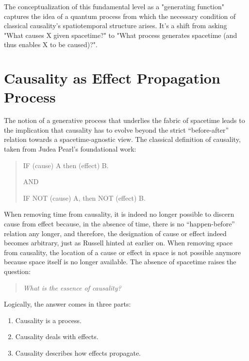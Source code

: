 \documentclass{article}
\begin{document}
The conceptualization of this fundamental level as a "generating function" captures the idea of a quantum process from which the necessary condition of classical causality's spatiotemporal structure arises. It's a shift from asking "What causes X given spacetime?" to "What process generates spacetime (and thus enables X to be caused)?".


\section{Causality as Effect Propagation Process}
\label{sec:epp}

The notion of a generative process that underlies the fabric of spacetime leads to the implication that causality has to evolve beyond the strict “before-after” relation towards a spacetime-agnostic view. The classical definition of causality, taken from Judea Pearl's foundational work\cite{pearl2000causality}: 

\begin{quote}
    IF (cause) A then (effect) B.
    
    AND 
    
    IF NOT (cause) A, then NOT (effect) B.
\end{quote}

When removing time from causality, it is indeed no longer possible to discern cause from effect because, in the absence of time, there is no “happen-before” relation any longer, and therefore, the designation of cause or effect indeed becomes arbitrary, just as Russell hinted at earlier on. When removing space from causality, the location of a cause or effect in space is not possible anymore because space itself is no longer available. The absence of spacetime raises the question: 
\begin{quote}
\begin{center}
    \textit{What is the essence of causality?}
\end{center}
\end{quote}

Logically, the answer comes in three parts:

\begin{enumerate}
    \item Causality is a process.
    \item Causality deals with effects.
    \item Causality describes how effects propagate.
\end{enumerate}
\end{document}
